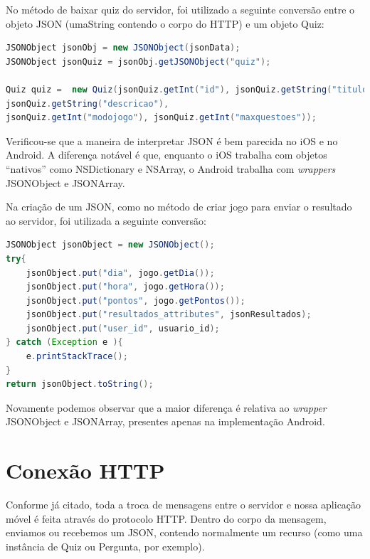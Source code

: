 		    No método de baixar quiz do servidor, foi utilizado a seguinte conversão entre o objeto \ac{JSON} (umaString contendo o corpo do \ac{HTTP}) e um objeto Quiz:
\begin{lstlisting}[language=Java]   
JSONObject jsonObj = new JSONObject(jsonData);
JSONObject jsonQuiz = jsonObj.getJSONObject("quiz");
                   
Quiz quiz =  new Quiz(jsonQuiz.getInt("id"), jsonQuiz.getString("titulo"),
jsonQuiz.getString("descricao"), 
jsonQuiz.getInt("modojogo"), jsonQuiz.getInt("maxquestoes"));
 \end{lstlisting}             
 
    Verificou-se que a maneira de interpretar \ac{JSON} é bem parecida no iOS e no Android. A diferença notável é que, enquanto o iOS trabalha com objetos ``nativos'' como NSDictionary e NSArray, o Android trabalha com \emph{wrappers} JSONObject e JSONArray.
   
    Na criação de um \ac{JSON}, como no método de criar jogo para enviar o resultado ao servidor, foi utilizada a seguinte conversão:
\begin{lstlisting}[language=Java]     
JSONObject jsonObject = new JSONObject();
try{
    jsonObject.put("dia", jogo.getDia());
    jsonObject.put("hora", jogo.getHora());
    jsonObject.put("pontos", jogo.getPontos());
    jsonObject.put("resultados_attributes", jsonResultados);
    jsonObject.put("user_id", usuario_id);
} catch (Exception e ){
    e.printStackTrace();
}
return jsonObject.toString();
\end{lstlisting}   
            
			Novamente podemos observar que a maior diferença é relativa ao \emph{wrapper} JSONObject e JSONArray, presentes apenas na implementação Android.
     
    \section {Conexão HTTP}
     
    Conforme já citado, toda a troca de mensagens entre o servidor e nossa aplicação móvel é feita através do protocolo \ac{HTTP}. Dentro do corpo da mensagem, enviamos ou recebemos um \ac{JSON}, contendo normalmente um recurso (como uma instância de Quiz ou Pergunta, por exemplo).
    
